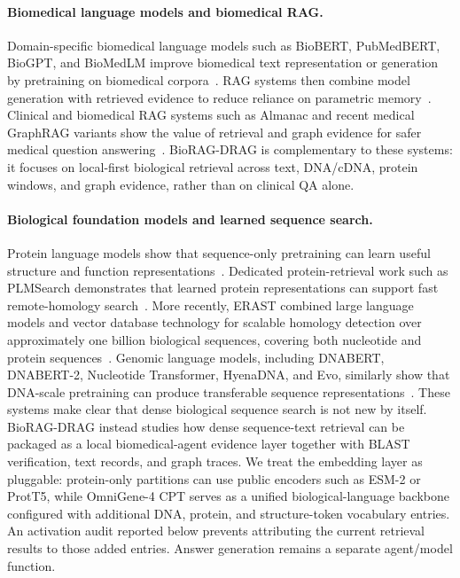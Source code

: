 \documentclass[11pt]{article}
\begin{document}
\paragraph{Biomedical language models and biomedical RAG.}
Domain-specific biomedical language models such as BioBERT, PubMedBERT, BioGPT, and BioMedLM improve biomedical text representation or generation by pretraining on biomedical corpora~\cite{lee2020biobert,gu2022pubmedbert,luo2022biogpt,bolton2024biomedlm}. RAG systems then combine model generation with retrieved evidence to reduce reliance on parametric memory~\cite{lewis2020rag}. Clinical and biomedical RAG systems such as Almanac and recent medical GraphRAG variants show the value of retrieval and graph evidence for safer medical question answering~\cite{zakka2023almanac,wu2024medgraphrag}. BioRAG-DRAG is complementary to these systems: it focuses on local-first biological retrieval across text, DNA/cDNA, protein windows, and graph evidence, rather than on clinical QA alone.

\paragraph{Biological foundation models and learned sequence search.}
Protein language models show that sequence-only pretraining can learn useful structure and function representations~\cite{rives2021biological,elnaggar2022prottrans,lin2023esmfold}. Dedicated protein-retrieval work such as PLMSearch demonstrates that learned protein representations can support fast remote-homology search~\cite{liu2024plmsearch}. More recently, ERAST combined large language models and vector database technology for scalable homology detection over approximately one billion biological sequences, covering both nucleotide and protein sequences~\cite{jiang2026erast}. Genomic language models, including DNABERT, DNABERT-2, Nucleotide Transformer, HyenaDNA, and Evo, similarly show that DNA-scale pretraining can produce transferable sequence representations~\cite{ji2021dnabert,zhou2023dnabert2,nguyen2023hyenadna,dallatorre2025nucleotide,nguyen2024evo}. These systems make clear that dense biological sequence search is not new by itself. BioRAG-DRAG instead studies how dense sequence-text retrieval can be packaged as a local biomedical-agent evidence layer together with BLAST verification, text records, and graph traces. We treat the embedding layer as pluggable: protein-only partitions can use public encoders such as ESM-2 or ProtT5, while OmniGene-4 CPT serves as a unified biological-language backbone configured with additional DNA, protein, and structure-token vocabulary entries. An activation audit reported below prevents attributing the current retrieval results to those added entries. Answer generation remains a separate agent/model function.
\end{document}
